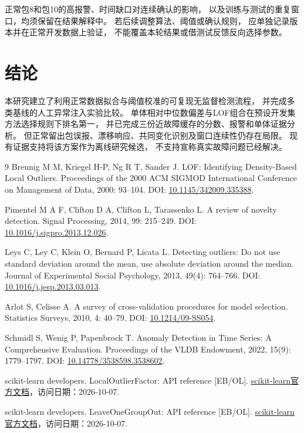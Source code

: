 \documentclass[UTF8,a4paper,12pt,fontset=fandol]{ctexart}
\begin{document}
正常包8和包10的高报警、时间缺口对连续确认的影响，
以及训练与测试的重复窗口，均须保留在结果解释中。
若后续调整算法、阈值或确认规则，
应单独记录版本并在正常开发数据上验证，
不能覆盖本轮结果或借测试反馈反向选择参数。

\section{结论}

本研究建立了利用正常数据拟合与阈值校准的可复现无监督检测流程，
并完成多类基线的人工异常注入实验比较。
单体相对中位数偏差与LOF组合在预设开发集方法选择规则下排名第一，
并已完成三份近故障缓存的分数、报警和单体证据分析。
但正常留出包误报、漂移响应、共同变化识别及窗口连续性仍存在局限。
现有证据支持将该方案作为离线研究候选，
不支持宣称真实故障问题已经解决。

\begin{thebibliography}{9}
Breunig M M, Kriegel H-P, Ng R T, Sander J.
LOF: Identifying Density-Based Local Outliers.
Proceedings of the 2000 ACM SIGMOD International Conference on Management of Data, 2000: 93--104.
DOI: \href{https://doi.org/10.1145/342009.335388}{10.1145/342009.335388}.

Pimentel M A F, Clifton D A, Clifton L, Tarassenko L.
A review of novelty detection.
Signal Processing, 2014, 99: 215--249.
DOI: \href{https://doi.org/10.1016/j.sigpro.2013.12.026}{10.1016/j.sigpro.2013.12.026}.

Leys C, Ley C, Klein O, Bernard P, Licata L.
Detecting outliers: Do not use standard deviation around the mean, use absolute deviation around the median.
Journal of Experimental Social Psychology, 2013, 49(4): 764--766.
DOI: \href{https://doi.org/10.1016/j.jesp.2013.03.013}{10.1016/j.jesp.2013.03.013}.

Arlot S, Celisse A.
A survey of cross-validation procedures for model selection.
Statistics Surveys, 2010, 4: 40--79.
DOI: \href{https://doi.org/10.1214/09-SS054}{10.1214/09-SS054}.

Schmidl S, Wenig P, Papenbrock T.
Anomaly Detection in Time Series: A Comprehensive Evaluation.
Proceedings of the VLDB Endowment, 2022, 15(9): 1779--1797.
DOI: \href{https://doi.org/10.14778/3538598.3538602}{10.14778/3538598.3538602}.

scikit-learn developers.
LocalOutlierFactor: API reference [EB/OL].
\href{https://scikit-learn.org/stable/modules/generated/sklearn.neighbors.LocalOutlierFactor.html}{scikit-learn官方文档}，访问日期：2026-10-07.

scikit-learn developers.
LeaveOneGroupOut: API reference [EB/OL].
\href{https://scikit-learn.org/stable/modules/generated/sklearn.model_selection.LeaveOneGroupOut.html}{scikit-learn官方文档}，访问日期：2026-10-07.
\end{thebibliography}
\end{document}

